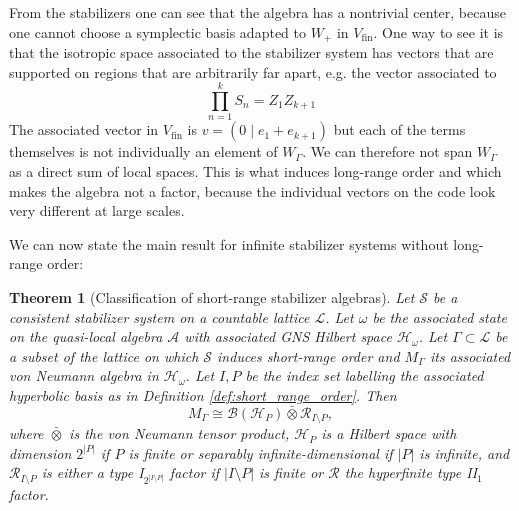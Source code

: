 \documentclass[aps,pra,reprint,superscriptaddress]{revtex4-2}
\newcommand{\cA}{{\mathcal A}}
\newcommand{\cB}{{\mathcal B}}
\newcommand{\cH}{{\mathcal H}}
\newcommand{\cL}{{\mathcal L}}
\newcommand{\cR}{{\mathcal R}}
\newcommand{\cS}{{\mathcal S}}
\newcommand\G{\Gamma}
\newcommand\w{\omega}
\newtheorem{theorem}{Theorem}
\theoremstyle{definition}
\theoremstyle{remark}
\begin{document}
From the stabilizers one can see that the algebra has a nontrivial
center, because one cannot choose a symplectic basis adapted to $W_{+}$ in
$V_{\mathrm{fin}}$. One way to see it is that the
isotropic space associated to the stabilizer system has vectors that are
supported on regions that are arbitrarily far apart, e.g. the vector associated
to
\begin{equation}
    \prod_{n=1}^{k} S_n = Z_1 Z_{k+1}
\end{equation}
The associated vector in $V_{\mathrm{fin}}$ is $v=(0\mid e_1+e_{k+1})$ but
each of the terms themselves is not individually an element of $W_\G$. We can
therefore not span $W_\G$ as a direct sum of local spaces. This is
what induces long-range order and which makes the algebra not a factor, because
the individual vectors on the code look very different at large scales.

We can now state the main result for infinite stabilizer systems without
long-range order:
    \begin{theorem}[Classification of short-range stabilizer algebras]\label{thm:short_range_algebra}
        Let $\cS$ be a consistent stabilizer system on a countable lattice $\cL$. Let $\w$ be the associated state on the quasi-local algebra $\cA$ with associated
        GNS Hilbert space $\cH_\w$. Let $\G \subset \cL$ be a subset of the lattice on which $\cS$ induces short-range order and $M_\G$ its
        associated von Neumann algebra in $\cH_\w$. Let $I,P$ be the index set labelling the associated hyperbolic basis as in Definition \ref{def:short_range_order}. Then 
        \begin{equation}
            M_\G \cong \cB(\cH_P)\bar\otimes\cR_{I\setminus P},
        \end{equation}
        where $\bar{\otimes}$ is the von Neumann tensor product, $\cH_P$ is a Hilbert space with dimension $2^{|P|}$ if $P$ is finite or separably infinite-dimensional if $|P|$ is infinite, and $\cR_{I\setminus P}$ is either a type I$_{2^{|I \setminus P| }}$ factor if $|I \setminus P|$ is finite or $\cR$ the hyperfinite type II$_1$ factor.
    \end{theorem}
\end{document}

